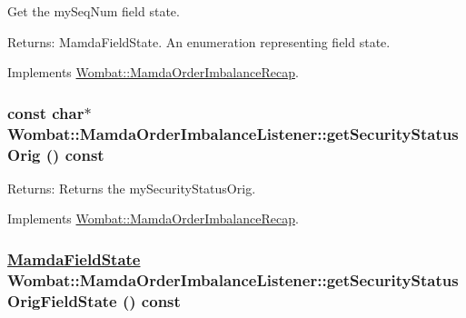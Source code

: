Get the my\-Seq\-Num field state. 

\begin{Desc}
\item[Returns:]Mamda\-Field\-State. An enumeration representing field state. \end{Desc}


Implements \hyperlink{classWombat_1_1MamdaOrderImbalanceRecap_5a26737b3bf2abcb981786581875357c}{Wombat::Mamda\-Order\-Imbalance\-Recap}.\hypertarget{classWombat_1_1MamdaOrderImbalanceListener_ea12f359de6aa79408f26d36ea8db179}{
\subsubsection[getSecurityStatusOrig]{\setlength{\rightskip}{0pt plus 5cm}const char$\ast$ Wombat::Mamda\-Order\-Imbalance\-Listener::get\-Security\-Status\-Orig () const}}
\label{classWombat_1_1MamdaOrderImbalanceListener_ea12f359de6aa79408f26d36ea8db179}


\begin{Desc}
\item[Returns:]Returns the my\-Security\-Status\-Orig. \end{Desc}


Implements \hyperlink{classWombat_1_1MamdaOrderImbalanceRecap_50880a888721be863d184627c984125b}{Wombat::Mamda\-Order\-Imbalance\-Recap}.\hypertarget{classWombat_1_1MamdaOrderImbalanceListener_1748b68453c66e890d34f666d6525832}{
\subsubsection[getSecurityStatusOrigFieldState]{\setlength{\rightskip}{0pt plus 5cm}\hyperlink{namespaceWombat_93aac974f2ab713554fd12a1fa3b7d2a}{Mamda\-Field\-State} Wombat::Mamda\-Order\-Imbalance\-Listener::get\-Security\-Status\-Orig\-Field\-State () const}}
\label{classWombat_1_1MamdaOrderImbalanceListener_1748b68453c66e890d34f666d6525832}


